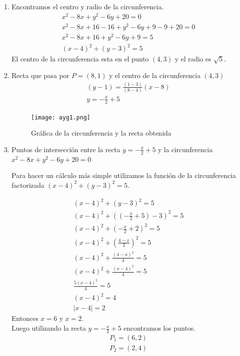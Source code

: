 \documentclass[a4paper,10pt]{article}
\providecommand{\abs}[1]{\lvert#1\rvert}
\begin{document}
\begin{enumerate}
\begin{enumerate}
\item Encontramos el centro y radio de la circunferencia.
\begin{gather*}
x^2-8x+y^2-6y+20=0\\
x^2-8x+16-16+y^2-6y+9-9+20=0\\
x^2-8x+16+y^2-6y+9=5\\
(x-4)^2+(y-3)^2=5
\end{gather*}
El centro de la circunferencia esta en el punto $(4,3)$ y el radio es $\sqrt{5}$.

\item Recta que pasa por $P=(8,1)$ y el centro de la circunferencia $(4,3)$
\begin{gather*}
(y-1)= \frac{(1-3)}{(8-4)}(x-8)\\
y= -\frac{x}{2}+5
\end{gather*}

\begin{figure}[ht]
    \centering
    \texttt{[image: ayg1.png]}
    \caption{Gráfica de la circunferencia y la recta obtenida}
    \label{ej3}
\end{figure}


\item Puntos de intersección entre la recta $y= -\frac{x}{2}+5$ y la circunferencia $x^2-8x+y^2-6y+20=0$

Para hacer un cálculo más simple utilizamos la función de la circunferencia factorizada $(x-4)^2+(y-3)^2=5$.

\begin{gather*}
(x-4)^2+(y-3)^2=5\\
(x-4)^2+((-\frac{x}{2}+5)-3)^2=5\\
(x-4)^2+(-\frac{x}{2}+2)^2=5\\
(x-4)^2+(\frac{4-x}{2})^2=5\\
(x-4)^2+\frac{(4-x)^2}{4}=5\\
(x-4)^2+\frac{(x-4)^2}{4}=5\\
\frac{5(x-4)^2}{4}=5\\
(x-4)^2=4\\
\abs{x-4}=2
\end{gather*}
Entonces $x=6$ y $x=2$.\\

Luego utilizando la recta $y= -\frac{x}{2}+5$ encontramos los puntos.
\begin{align*}
P_1 = (6,2)\\ 
P_2=(2,4)
\end{align*}
\end{enumerate}


\end{enumerate}
\end{document}
